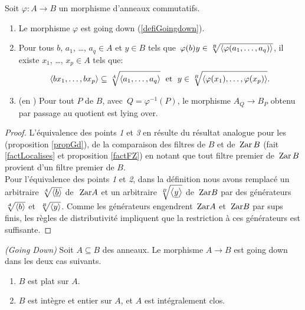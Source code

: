 \begin{lemma}\label{lem1Gdown}
\label{lemGD2} Soit $\varphi:A\to B$ un morphisme d'anneaux commutatifs. 
\Propeq
%
\begin{enumerate}
%
\item Le morphisme $\varphi$ est going down (\dfn \ref{defiGoingdown}).
\item Pour tous $b$, $a_1$, \ldots, $a_q\in A$ et $y\in B$ tels que~$\varphi(b)y\in\sqrt[B]{\left\langle{\varphi(a_1,\dots,a_q)}\right\rangle}$,
il existe %
$x_1$, \dots, $x_p\in A$ tels que:
$$
\left\langle{bx_1,\dots,bx_p}\right\rangle\subseteq  \sqrt[A]{\left\langle{a_1,\dots,a_q}\right\rangle} \;\hbox{ et }\;y\in\sqrt[B]{\left\langle{\varphi(x_1), \dots, \varphi(x_p)}\right\rangle}.
$$
\item (en \clama) Pour tout \idep $P$ de $B$, \hbox{avec $Q=\varphi^{-1}(P)$}, le morphisme $A_Q\to B_P$ obtenu par passage au quotient est lying over.
%
\end{enumerate}
\end{lemma}
%
\begin{proof}
L'équivalence des points \emph{1} et \emph{3} en \clama résulte du résultat  analogue pour les \trdis (proposition \ref{propGd}), de la comparaison des filtres de $B$ et de $\,{\rm Zar}\,B$ (fait \ref{factLocalises} et proposition \ref{factFZ}) en notant que tout filtre premier de $\,{\rm Zar}\,B$ provient d'un filtre premier de $B$.
\\
Pour l'équivalence des points \emph{1} et \emph{2}, dans la définition
nous avons remplacé  un \elt arbitraire $\sqrt[A]{\left\langle{\underline b}\right\rangle}$ de~$\,{\rm Zar} A$ et un
\elt arbitraire $\sqrt[B]{\left\langle{\underline y}\right\rangle}$ de $\,{\rm Zar} B$ par des générateurs~$\sqrt[A]{\left\langle{b}\right\rangle}$ et~$\sqrt[B]{\left\langle{y}\right\rangle}$.
Comme les générateurs   engendrent $\,{\rm Zar} A$ et $\,{\rm Zar} B$
par sups finis, les r\`egles de distributivité impliquent que la restriction \`a ces générateurs
est suffisante.
\end{proof}
%


\begin{theorem} 
\label{thGDplat} {\em (Going Down)} 
Soit $A\subseteq B$ des anneaux. Le morphisme $A\to B$ est going down dans les deux cas suivants. 
%
\begin{enumerate}
%
\item $B$ est plat sur $A$.
%
\item $B$ est intègre et entier sur $A$, et $A$ est intégralement clos.
%
\end{enumerate}
\end{theorem}




